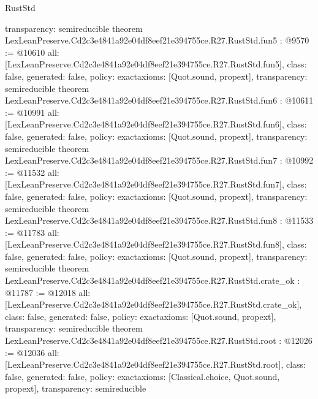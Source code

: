 \begin{lexlean}{RustStd}
\begin{coremodule}
{  transparency: semireducible
}
theorem LexLeanPreserve.Cd2c3e4841a92e04df8eef21e394755ce.R27.RustStd.fun5 : @9570 := @10610 {
  all: [LexLeanPreserve.Cd2c3e4841a92e04df8eef21e394755ce.R27.RustStd.fun5],
  class: false,
  generated: false,
  policy: exact{axioms: [Quot.sound, propext]},
  transparency: semireducible
}
theorem LexLeanPreserve.Cd2c3e4841a92e04df8eef21e394755ce.R27.RustStd.fun6 : @10611 := @10991 {
  all: [LexLeanPreserve.Cd2c3e4841a92e04df8eef21e394755ce.R27.RustStd.fun6],
  class: false,
  generated: false,
  policy: exact{axioms: [Quot.sound, propext]},
  transparency: semireducible
}
theorem LexLeanPreserve.Cd2c3e4841a92e04df8eef21e394755ce.R27.RustStd.fun7 : @10992 := @11532 {
  all: [LexLeanPreserve.Cd2c3e4841a92e04df8eef21e394755ce.R27.RustStd.fun7],
  class: false,
  generated: false,
  policy: exact{axioms: [Quot.sound, propext]},
  transparency: semireducible
}
theorem LexLeanPreserve.Cd2c3e4841a92e04df8eef21e394755ce.R27.RustStd.fun8 : @11533 := @11783 {
  all: [LexLeanPreserve.Cd2c3e4841a92e04df8eef21e394755ce.R27.RustStd.fun8],
  class: false,
  generated: false,
  policy: exact{axioms: [Quot.sound, propext]},
  transparency: semireducible
}
theorem LexLeanPreserve.Cd2c3e4841a92e04df8eef21e394755ce.R27.RustStd.crate_ok : @11787 := @12018 {
  all: [LexLeanPreserve.Cd2c3e4841a92e04df8eef21e394755ce.R27.RustStd.crate_ok],
  class: false,
  generated: false,
  policy: exact{axioms: [Quot.sound, propext]},
  transparency: semireducible
}
theorem LexLeanPreserve.Cd2c3e4841a92e04df8eef21e394755ce.R27.RustStd.root : @12026 := @12036 {
  all: [LexLeanPreserve.Cd2c3e4841a92e04df8eef21e394755ce.R27.RustStd.root],
  class: false,
  generated: false,
  policy: exact{axioms: [Classical.choice, Quot.sound, propext]},
  transparency: semireducible
}


\end{coremodule}
\end{lexlean}
